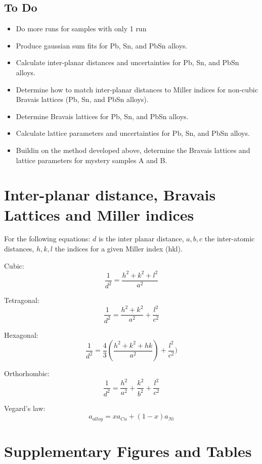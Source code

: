 \documentclass[12pt]{article}
\begin{document}
\subsection*{To Do}
\begin{itemize}
	\item Do more runs for samples with only 1 run
	\item Produce gaussian sum fits for Pb, Sn, and PbSn alloys.
	\item Calculate inter-planar distances and uncertainties for Pb, Sn, and PbSn alloys.
	\item Determine how to match inter-planar distances to Miller indices for non-cubic Bravais lattices (Pb, Sn, and PbSn alloys).
	\item Determine Bravais lattices for Pb, Sn, and PbSn alloys.
	\item Calculate lattice parameters and uncertainties for Pb, Sn, and PbSn alloys.
	\item Buildin on the method developed above, determine the Bravais lattices and lattice parameters for mystery samples A and B.
\end{itemize}





\appendix
\renewcommand{\thesection}{Appendix \Alph{section}. }
\renewcommand{\thesubsection}{\Alph{section}.\arabic{subsection}. }

\section{Inter-planar distance, Bravais Lattices and Miller indices}\label{A:brav_eq}

For the following equations: $d$ is the inter planar distance, $a,b,c$
the inter-atomic distances, $h,k,l$ the indices for a given Miller index (hkl).

Cubic: \[\frac{1}{d^2}=\frac{h^2+k^2+l^2}{a^2}\]

Tetragonal: \[\frac{1}{d^2}=\frac{h^2+k^2}{a^2}+\frac{l^2}{c^2}\]

Hexagonal: \[\frac{1}{d^2}=\frac{4}{3}(\frac{h^2+k^2+hk}{a^2})+\frac{l^2}{c^2})\]

Orthorhombic: \[\frac{1}{d^2}=\frac{h^2}{a^2}+\frac{k^2}{b^2}+\frac{l^2}{c^2}\]

Vegard's law: \[a_{alloy}=x a_{Cu}+(1-x) a_{Ni}\]

\section{Supplementary Figures and Tables}
\label{A:residuals}
\end{document}
